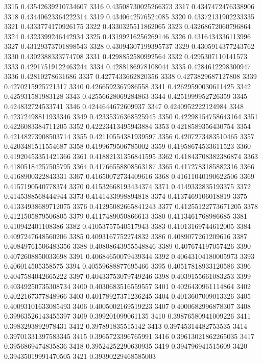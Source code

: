 3315 0.43542639210734607
3316 0.43508730025266373
3317 0.4347472476338906
3318 0.43440623364222314
3319 0.4340642576524085
3320 0.43372131902233335
3321 0.4333774170926175
3322 0.4330325511862065
3323 0.43268672060796864
3324 0.4323399246442934
3325 0.43199216256269146
3326 0.4316434336113996
3327 0.43129373701898543
3328 0.43094307199395737
3329 0.4305914377243762
3330 0.4302388333774708
3331 0.4298852580992564
3332 0.4295307110141573
3333 0.42917519122463244
3334 0.4288186978108044
3335 0.4284612298300947
3336 0.42810278631686
3337 0.4277433662820356
3338 0.4273829687127808
3339 0.4270215925721317
3340 0.4266592367986558
3341 0.42629590030611425
3342 0.425931581983128
3343 0.42556628069284863
3344 0.4251999952726359
3345 0.424832724533741
3346 0.4244644672609937
3347 0.4240952222124984
3348 0.42372498811933346
3349 0.42335376368525945
3350 0.42298154758643164
3351 0.4226083384711205
3352 0.42223413495943884
3353 0.4218589356430754
3354 0.42148273908503714
3355 0.42110554381939597
3356 0.4207273483510465
3357 0.4203481511554687
3358 0.4199679506785002
3359 0.41958674533611523
3360 0.41920453351421366
3361 0.41882131356841595
3362 0.41843708382386874
3363 0.41805184257505795
3364 0.41766558808563187
3365 0.4172783185882316
3366 0.4168900322843331
3367 0.41650072734409616
3368 0.41611040190622506
3369 0.4157190540778374
3370 0.41532668193434374
3371 0.4149332835193375
3372 0.4145388568444944
3373 0.4141433998894818
3374 0.4137469106018819
3375 0.41334938689712075
3376 0.41295082665841243
3377 0.41255122773671205
3378 0.4121505879506805
3379 0.4117489050866613
3380 0.4113461768986685
3381 0.410942401108386
3382 0.41053757540517943
3383 0.41013169744612005
3384 0.4097247648560206
3385 0.4093167752274832
3386 0.4089077261209616
3387 0.40849761506483356
3388 0.40808643955548846
3389 0.407674197057426
3390 0.4072608850033698
3391 0.40684650079439344
3392 0.40643104180005973
3393 0.406014505358575
3394 0.40559688877695466
3395 0.40517818933120586
3396 0.4047584042665222
3397 0.40433753079749246
3398 0.4039155661083253
3399 0.40349250735308734
3400 0.4030683516559557
3401 0.4026430961114864
3402 0.4022167377848966
3403 0.40178927371236245
3404 0.4013607009013326
3405 0.40093101633085493
3406 0.4005002169519223
3407 0.4000682996878307
3408 0.39963526143455397
3409 0.399201099061135
3410 0.39876580941009226
3411 0.3983293892978431
3412 0.397891835515142
3413 0.39745314482753535
3414 0.39701331397583345
3415 0.3965723396765991
3416 0.39613021862265035
3417 0.3956869474835836
3418 0.39524252290630935
3419 0.394796941515609
3420 0.39435019991470505
3421 0.39390229468585003
